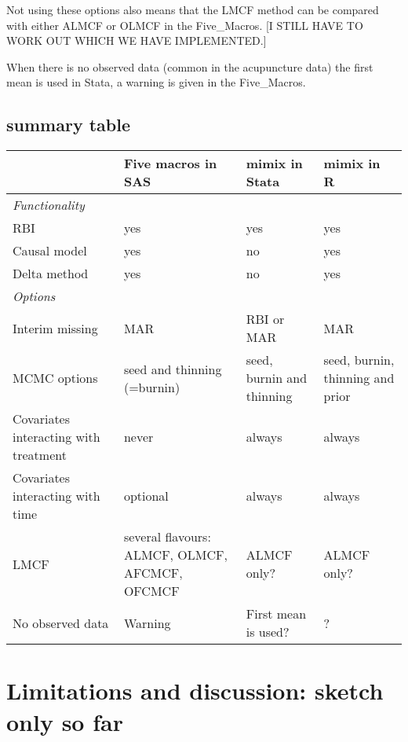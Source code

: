 Not using these options also means that the LMCF method can be compared with either ALMCF or OLMCF in the Five\_Macros.
[I STILL HAVE TO WORK OUT WHICH WE HAVE IMPLEMENTED.]

When there is no observed data (common in the acupuncture data) the first mean is used in Stata,
a warning is given in the Five\_Macros.

\subsection{summary table}

\begin{tabular}{p{}p{}p{}p{}}\hline
	&	Five macros in SAS	&	mimix in Stata	&	mimix in R	\\\hline
{\em Functionality}	&		&		&		\\
RBI	&	yes	&	yes	&	yes	\\
Causal model	&	yes	&	no	&	yes	\\
Delta method	&	yes	&	no	&	yes	\\\hline
{\em Options}	&		&		&		\\
Interim missing	&	MAR	&	RBI or MAR	&	MAR	\\
MCMC options	&	seed and thinning (=burnin)	&	seed, burnin and thinning	&	seed, burnin, thinning and prior	\\
Covariates interacting with treatment	&	never	&	always	&	always	\\
Covariates interacting with time	&	optional	&	always	&	always	\\
LMCF	&	several flavours: ALMCF, OLMCF, AFCMCF, OFCMCF	&	ALMCF only?	&	ALMCF only?	\\
No observed data	&	Warning	&	First mean is used?	&	?	\\\hline
\end{tabular}




\section{Limitations and discussion: sketch only so far}

